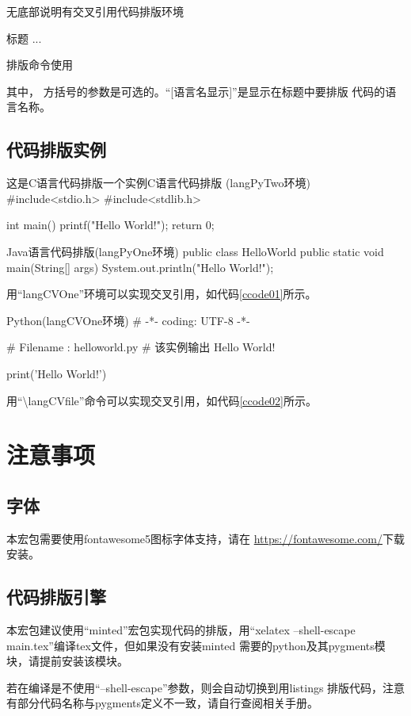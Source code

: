 \documentclass{ctexart}
\newcommand{\qtmark}[1]{``#1''}
\begin{document}
\begin{langPyOne}[tex]{无底部说明有交叉引用代码排版环境}
  \begin{langCVOne}[语言][交叉引用标签][显示语言名]{标题}
     ...
   \end{langCVOne} 
\end{langPyOne}

\begin{langPyOne}[tex]{排版命令使用}
\end{langPyOne}
其中， 方括号的参数是可选的。\qtmark{[语言名显示]}是显示在标题中要排版
代码的语言名称。

\subsection{代码排版实例}
\begin{langPyTwo}[c]{这是C语言代码排版一个实例}{C语言代码排版
    (langPyTwo环境)}
  #include<stdio.h>
  #include<stdlib.h>

  int main()
  {
    printf("Hello World!\n");
    return 0;
  }
\end{langPyTwo}

\begin{langPyOne}[java]{Java语言代码排版(langPyOne环境)}
  public class HelloWorld {
    public static void main(String[] args){
      System.out.println("Hello World!");
    }
  }
\end{langPyOne}


用\qtmark{langCVOne}环境可以实现交叉引用，如代码\ref{ccode01}所示。
\begin{langCVOne}[python][ccode01][Python]{Python(langCVOne环境)}
  # -*- coding: UTF-8 -*-

  # Filename : helloworld.py
  # 该实例输出 Hello World!

  print('Hello World!')
\end{langCVOne}

用\qtmark{\textbackslash langCVfile}命令可以实现交叉引用，如代码\ref{ccode02}所示。


\section{注意事项}
\subsection{字体}
本宏包需要使用fontawesome5图标字体支持，请在
\url{https://fontawesome.com/}下载安装。
\subsection{代码排版引擎}
本宏包建议使用\qtmark{minted}宏包实现代码的排版，用\qtmark{xelatex
  --shell-escape main.tex}编译tex文件，但如果没有安装minted
需要的python及其pygments模块，请提前安装该模块。

若在编译是不使用\qtmark{--shell-escape}参数，则会自动切换到用listings
排版代码，注意有部分代码名称与pygments定义不一致，请自行查阅相关手册。
\end{document}
